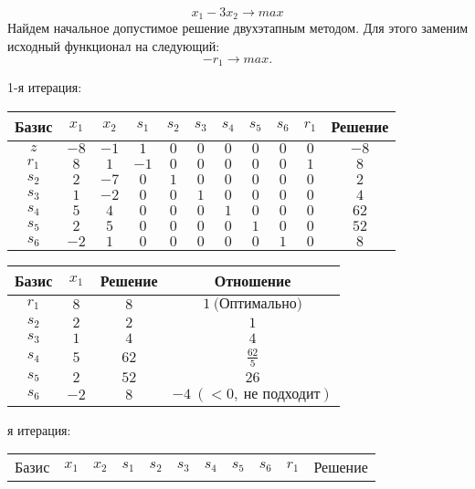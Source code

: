 \documentclass{article}%
\begin{document}
\[%
x_{1}-3x_{2}  \to max%
\]%
Найдем начальное допустимое решение двухэтапным методом. Для этого заменим исходный функционал на следующий: %
\[%
-r_{1}\to max.%
\]%
\begin{flushleft}%
1{-}я итерация: %
\newline%
\newline%
\renewcommand{\arraystretch}{1.3}%
\begin{tabular}{|c|ccccccccc|c|}%
\hline%
Базис&$x_{1}$&$x_{2}$&$s_{1}$&$s_{2}$&$s_{3}$&$s_{4}$&$s_{5}$&$s_{6}$&$r_{1}$&Решение\\%
\hline%
$z$&$-8$&$-1$&$1$&$0$&$0$&$0$&$0$&$0$&$0$&$-8$\\%
\hline%
$r_{1}$&$8$&$1$&$-1$&$0$&$0$&$0$&$0$&$0$&$1$&$8$\\%
$s_{2}$&$2$&$-7$&$0$&$1$&$0$&$0$&$0$&$0$&$0$&$2$\\%
$s_{3}$&$1$&$-2$&$0$&$0$&$1$&$0$&$0$&$0$&$0$&$4$\\%
$s_{4}$&$5$&$4$&$0$&$0$&$0$&$1$&$0$&$0$&$0$&$62$\\%
$s_{5}$&$2$&$5$&$0$&$0$&$0$&$0$&$1$&$0$&$0$&$52$\\%
$s_{6}$&$-2$&$1$&$0$&$0$&$0$&$0$&$0$&$1$&$0$&$8$\\%
\hline%
\end{tabular}%
\newline%
\newline%
\newline%
\begin{tabular}{|cccc|}%
\hline%
Базис&$x_{1}$&Решение&Отношение\\%
\hline%
$r_{1}$&$8$&$8$&$1\: \text{(Оптимально)}$\\%
$s_{2}$&$2$&$2$&$1$\\%
$s_{3}$&$1$&$4$&$4$\\%
$s_{4}$&$5$&$62$&$\frac{62}{5}$\\%
$s_{5}$&$2$&$52$&$26$\\%
$s_{6}$&$-2$&$8$&$-4\: (< 0, \: \text{не подходит})$\\%
\hline%
\end{tabular}%
\newline%
\newline%
я итерация: %
\newline%
\newline%
\renewcommand{\arraystretch}{1.3}%
\begin{tabular}{|c|ccccccccc|c|}%
\hline%
Базис&$x_{1}$&$x_{2}$&$s_{1}$&$s_{2}$&$s_{3}$&$s_{4}$&$s_{5}$&$s_{6}$&$r_{1}$&Решение\\%

\end{tabular}
\end{flushleft}
\end{document}
